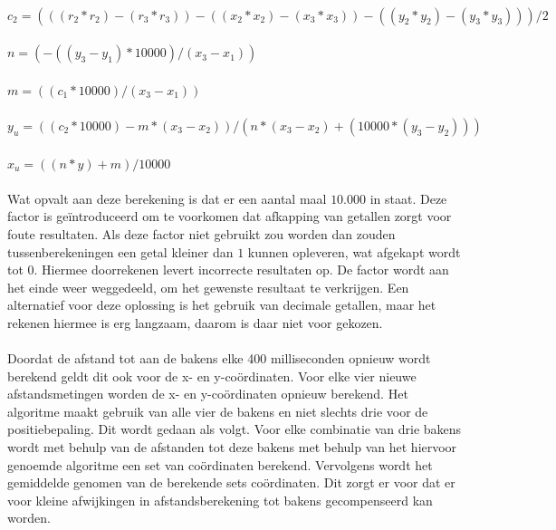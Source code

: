 \documentclass{article}
\begin{document}
\\
\indent$c_2 = (((r_2*r_2)-(r_3*r_3))-((x_2*x_2)-(x_3*x_3))-((y_2*y_2)-(y_3*y_3)))/2 $\\
\\
\indent$n =(-((y_3-y_1)*10000)/(x_3-x_1)) $\\
\\
\indent$m = ((c_1*10000)/(x_3-x_1)) $\\
\\
\indent$y_u = ((c_2*10000) - m*(x_3-x_2))/(n*(x_3-x_2) + (10000*(y_3-y_2))) $\\
\\
\indent$x_u = ((n*y)+m)/10000 $\\
\\
Wat opvalt aan deze berekening is dat er een aantal maal $10.000$ in staat. Deze factor is ge\"introduceerd om te voorkomen dat afkapping van getallen zorgt voor foute resultaten. Als deze factor niet gebruikt zou worden dan zouden tussenberekeningen een getal kleiner dan $1$ kunnen opleveren, wat afgekapt wordt tot $0$.  Hiermee doorrekenen levert incorrecte resultaten op. De factor wordt aan het einde weer weggedeeld, om het gewenste resultaat te verkrijgen. Een alternatief voor deze oplossing is het gebruik van decimale getallen, maar het rekenen hiermee is erg langzaam, daarom is daar niet voor gekozen.\\
\\
Doordat de afstand tot aan de bakens elke 400 milliseconden opnieuw wordt berekend geldt dit ook voor de x- en y-co\"{o}rdinaten. Voor elke vier nieuwe afstandsmetingen worden de x- en y-co\"ordinaten opnieuw berekend. Het algoritme maakt gebruik van alle vier de bakens en niet slechts drie voor de positiebepaling. Dit wordt gedaan als volgt. Voor elke combinatie van drie bakens wordt met behulp van de afstanden tot deze bakens met behulp van het hiervoor genoemde algoritme een set van co\"ordinaten berekend. Vervolgens wordt het gemiddelde genomen van de berekende sets co\"ordinaten. Dit zorgt er voor dat er voor kleine afwijkingen in afstandsberekening tot bakens gecompenseerd kan worden.
\end{document}
